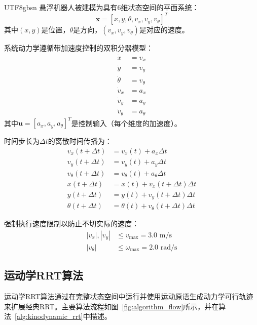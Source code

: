 \documentclass[11pt]{article}
\begin{document}
\begin{CJK}{UTF8}{gbsn}
悬浮机器人被建模为具有6维状态空间的平面系统：
\begin{equation}
\mathbf{x} = [x, y, \theta, v_x, v_y, v_\theta]^T
\end{equation}
其中$(x, y)$是位置，$\theta$是方向，$(v_x, v_y, v_\theta)$是对应的速度。

系统动力学遵循带加速度控制的双积分器模型：
\begin{align}
\dot{x} &= v_x \\
\dot{y} &= v_y \\
\dot{\theta} &= v_\theta \\
\dot{v}_x &= a_x \\
\dot{v}_y &= a_y \\
\dot{v}_\theta &= a_\theta
\end{align}
其中$\mathbf{u} = [a_x, a_y, a_\theta]^T$是控制输入（每个维度的加速度）。

时间步长为$\Delta t$的离散时间传播为：
\begin{align}
v_x(t+\Delta t) &= v_x(t) + a_x \Delta t \\
v_y(t+\Delta t) &= v_y(t) + a_y \Delta t \\
v_\theta(t+\Delta t) &= v_\theta(t) + a_\theta \Delta t \\
x(t+\Delta t) &= x(t) + v_x(t+\Delta t) \Delta t \\
y(t+\Delta t) &= y(t) + v_y(t+\Delta t) \Delta t \\
\theta(t+\Delta t) &= \theta(t) + v_\theta(t+\Delta t) \Delta t
\end{align}

强制执行速度限制以防止不切实际的速度：
\begin{align}
|v_x|, |v_y| &\leq v_{\max} = 3.0 \text{ m/s} \\
|v_\theta| &\leq \omega_{\max} = 2.0 \text{ rad/s}
\end{align}

\subsection{运动学RRT算法}

运动学RRT算法通过在完整状态空间中运行并使用运动原语生成动力学可行轨迹来扩展经典RRT。主要算法流程如图~\ref{fig:algorithm_flow}所示，并在算法~\ref{alg:kinodynamic_rrt}中描述。


\end{CJK}
\end{document}
